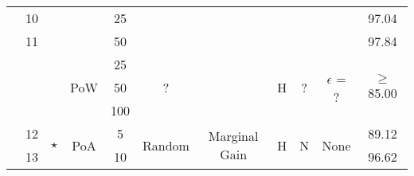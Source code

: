 \begin{landscape}
\begin{table}
\begin{tabular}{c|c|c|c|c|c|c|c|c|c|c}
                                                                                            & 10                  &                                                     &                            & 25                       &                         &                                &                    &                    &                        & 97.04 \\ \cline{2-2}\cline{11-11}\cline{5-5}
                                                                                            & 11                  &                                                     &                            & 50                       &                         &                                &                    &                    &                        & 97.84 \\ \cline{2-6}\cline{8-11}
                                                                                            & \multirow{3}{*}{}   & \multirow{3}{*}{\cite{10.48550/arxiv.2007.03856}}   & \multirow{3}{*}{PoW}       & 25                       & \multirow{3}{*}{?}      &                                & \multirow{3}{*}{H} & \multirow{3}{*}{?} & \multirow{3}{*}{$\epsilon$ = ?} & \multirow{3}{*}{$\geq$ 85.00}   \\ \cline{5-5}
                                                                                            &                     &                                                     &                            & 50                       &                         &                                &                    &                    &                        & \\\cline{5-5}
                                                                                            &                     &                                                     &                            & 100                      &                         &                                &                    &                    &                        & \\ \cline{2-11}
                                                                                            & 12                  & \multirow{4}{*}{$\star$}                            & \multirow{4}{*}{PoA}       & 5                        & \multirow{4}{*}{Random} & \multirow{5}{*}{Marginal Gain} & \multirow{4}{*}{H} & \multirow{4}{*}{N} & \multirow{4}{*}{None}  & 89.12 \\ \cline{2-2}\cline{11-11}\cline{5-5}
                                                                                            & 13                  &                                                     &                            & 10                       &                         &                                &                    &                    &                        & 96.62 \\ \cline{2-2}\cline{11-11}\cline{5-5}

\end{tabular}
\end{table}
\end{landscape}
